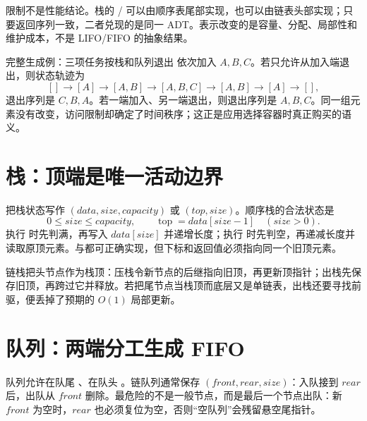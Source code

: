 \documentclass[UTF8,fontset=none,11pt,a4paper]{ctexart}
\begin{document}
限制不是性能结论。栈的 / 可以由顺序表尾部实现，也可以由链表头部实现；只要返回序列一致，二者兑现的是同一 ADT。表示改变的是容量、分配、局部性和维护成本，不是 LIFO/FIFO 的抽象结果。

\begin{examplebox}{完整生成例：三项任务按栈和队列退出}
依次加入 $A,B,C$。若只允许从加入端退出，则状态轨迹为
\[
[]\to[A]\to[A,B]\to[A,B,C]\to[A,B]\to[A]\to[],
\]
退出序列是 $C,B,A$。若一端加入、另一端退出，则退出序列是 $A,B,C$。同一组元素没有改变，访问限制却确定了时间秩序；这正是应用选择容器时真正购买的语义。
\end{examplebox}

\section{栈：顶端是唯一活动边界}
把栈状态写作 $(data,size,capacity)$ 或 $(top,size)$。顺序栈的合法状态是
\[
0\le size\le capacity,\qquad
\operatorname{top}=data[size-1]\quad(size>0).
\]
执行  时先判满，再写入 $data[size]$ 并递增长度；执行  时先判空，再递减长度并读取原顶元素。与都可正确实现，但下标和返回值必须指向同一个旧顶元素。

链栈把头节点作为栈顶：压栈令新节点的后继指向旧顶，再更新顶指针；出栈先保存旧顶，再跨过它并释放。若把尾节点当栈顶而底层又是单链表，出栈还要寻找前驱，便丢掉了预期的 $O(1)$ 局部更新。

\begin{center}
\end{center}

\section{队列：两端分工生成 FIFO}
队列允许在队尾 、在队头 。链队列通常保存 $(front,rear,size)$：入队接到 $rear$ 后，出队从 $front$ 删除。最危险的不是一般节点，而是最后一个节点出队：新 $front$ 为空时，$rear$ 也必须复位为空，否则“空队列”会残留悬空尾指针。
\end{document}
